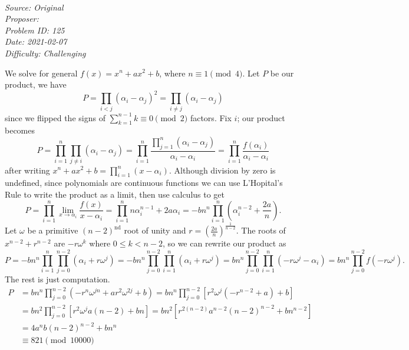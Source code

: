 \SSbreak\\
\emph{Source: Original}\\
\emph{Proposer: \Ptan}\\ %
\emph{Problem ID: 125}\\
\emph{Date: 2021-02-07}\\
\emph{Difficulty: Challenging}\\
\SSbreak

\bigskip

\begin{solution}\hfil\medskip
	
	We solve for general $f(x) = x^n + ax^2 + b$, where $n \equiv 1 \pmod{4}$. Let $P$ be our product, we have 
	$$P = \prod_{i < j}\left(\alpha_i - \alpha_j\right)^2 = \prod_{i \neq j}\left(\alpha_i - \alpha_j\right)$$
	since we flipped the signs of $\sum_{k = 1}^{n - 1}k \equiv 0 \pmod{2}$ factors. Fix $i$; our product becomes
	$$P = \prod_{i = 1}^n \prod_{j \neq i} \left(\alpha_i - \alpha_j\right) 
	= \prod_{i = 1}^n \dfrac{\prod_{j = 1}^n \left(\alpha_i - \alpha_j\right)}{\alpha_i - \alpha_i} 
	= \prod_{i = 1}^n \dfrac{f\left(\alpha_i\right)}{\alpha_i - \alpha_i}$$
	after writing $x^n + ax^2 + b = \prod_{i = 1}^n \left(x - \alpha_i\right)$. Although division by zero is undefined, since polynomials are continuous functions
	we can use L'Hopital's Rule to write the product as a limit, then use calculus to get
	$$P = \prod_{i = 1}^n \lim_{x \to \alpha_i} \dfrac{f(x)}{x - \alpha_i} = \prod_{i = 1}^n n\alpha_i^{n - 1} + 2a\alpha_i 
	= -b n^n \prod_{i = 1}^n \left(\alpha_i^{n - 2} + \dfrac{2a}{n}\right).$$
	Let $\omega$ be a primitive $(n - 2)^\text{nd}$ root of unity and $r = \left(\frac{2a}{n}\right)^{\frac{1}{n - 2}}$. The roots of 
	$x^{n - 2} + r^{n - 2}$ are $-r\omega^k$ where $0 \leq k < n - 2$, so we can rewrite our product as
	$$P = -bn^n \prod_{i = 1}^n \prod_{j = 0}^{n - 2} \left(\alpha_i + r \omega^j\right) = -bn^n\prod_{j = 0}^{n - 2} \prod_{i = 1}^n \left(\alpha_i + r \omega^j\right)
	= bn^n\prod_{j = 0}^{n - 2} \prod_{i = 1}^n \left(-r \omega^j - \alpha_i\right) = bn^n \prod_{j = 0}^{n - 2} f\left(-r \omega^j\right).$$
	The rest is just computation.
	\begin{align*}
		P &= bn^n \prod_{j = 0}^{n - 2} \left(- r^n \omega^{jn} + ar^2 \omega^{2j} + b\right) = bn^n \prod_{j = 0}^{n - 2} \left[r^2 \omega^j \left(-r^{n - 2} + a\right) + b\right] \\
		&= bn^2 \prod_{j = 0}^{n - 2} \left[r^2 \omega^j a (n - 2) + bn\right] = bn^2 \left[r^{2(n - 2)} a^{n - 2} (n - 2)^{n - 2} + bn^{n - 2}\right] \\
		&= 4a^nb(n - 2)^{n - 2} + bn^n \\
		&\equiv \boxed{821} \pmod{10000}
	\end{align*}
\end{solution}\bigskip

